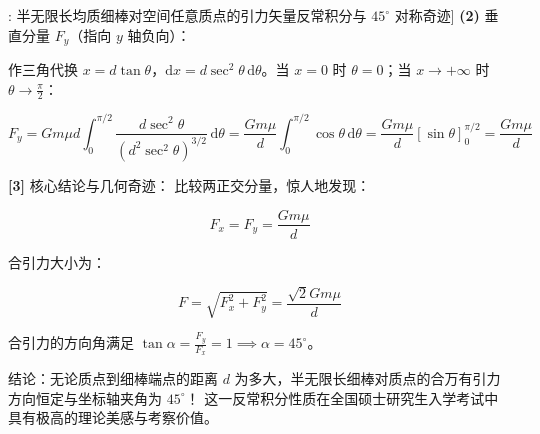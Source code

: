 \documentclass[11pt,a4paper,UTF8]{ctexart}
\begin{document}
\begin{thmbox}[模型[3]: 半无限长均质细棒对空间任意质点的引力矢量反常积分与 $45^\circ$ 对称奇迹]
\textbf{(2)}  \textit{}垂直分量 $F_y$（指向 $y$ 轴负向）\textit{}：

作三角代换 $x = d \tan\theta$，$\mathrm{d}x = d \sec^2\theta\,\mathrm{d}\theta$。当 $x = 0$ 时 $\theta = 0$；当 $x \to +\infty$ 时 $\theta \to \frac{\pi}{2}$：


\begin{equation*}
F_y = G m \mu d \int_0^{\pi/2} \frac{d \sec^2\theta}{(d^2 \sec^2\theta)^{3/2}}\,\mathrm{d}\theta = \frac{G m \mu}{d} \int_0^{\pi/2} \cos\theta\,\mathrm{d}\theta = \frac{G m \mu}{d} [\sin\theta]_0^{\pi/2} = \frac{G m \mu}{d}
\end{equation*}


\textbf{[3]} 核心结论与几何奇迹：
比较两正交分量，惊人地发现：


\begin{equation*}
F_x = F_y = \frac{G m \mu}{d}
\end{equation*}


合引力大小为：


\begin{equation*}
F = \sqrt{F_x^2 + F_y^2} = \frac{\sqrt{2}G m \mu}{d}
\end{equation*}


合引力的方向角满足 $\tan\alpha = \frac{F_y}{F_x} = 1 \implies \alpha = 45^\circ$。

结论：\textit{}无论质点到细棒端点的距离 $d$ 为多大，半无限长细棒对质点的合万有引力方向恒定与坐标轴夹角为 $45^\circ$！\textit{} 这一反常积分性质在全国硕士研究生入学考试中具有极高的理论美感与考察价值。

\end{thmbox}
\end{document}
